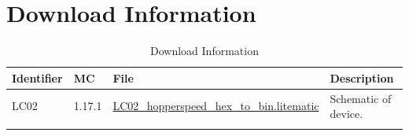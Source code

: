 \documentclass[10pt]{datasheet}
\begin{document}
\section{Download Information}
\begin{table}[h]
    \caption{Download Information}
    \begin{tabularx}{\textwidth}{l | l | l | X}
        \thickhline
        \textbf{Identifier} & \textbf{MC} & \textbf{File} & \textbf{Description} \\
        \hline
        LC02 & 1.17.1 & \href{https://github.com/Soontech-Annals/Archive/blob/b56572c0d2b4f182d9e9d41449d8cb2963b923ae/Archive/logic-and-computation/LC02\%20Hopperspeed\%20Hex\%20to\%20Binary/LC02\_hopperspeed\_hex\_to\_bin.litematic?raw=1}{LC02\_hopperspeed\_hex\_to\_bin.litematic} & Schematic of device. \\
        \hline
        \thickhline
    \end{tabularx}
\end{table}
\end{document}
